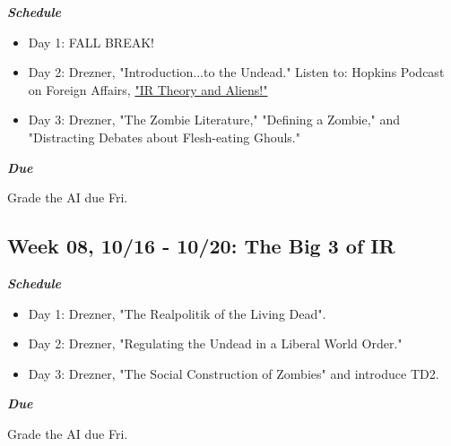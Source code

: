 \documentclass[11pt,]{article}
\begin{document}
\begin{multicols}{2}

\textbf{\textit{Schedule}}

\begin{itemize}

\item Day 1: FALL BREAK!

\item Day 2: Drezner, "Introduction...to the Undead." Listen to: Hopkins Podcast on Foreign Affairs, \href{https://hopkinspofa.com/2018/01/20/ir-theory-aliens/}{"IR Theory and Aliens!"}

\item Day 3: Drezner, "The Zombie Literature," "Defining a Zombie," and "Distracting Debates about Flesh-eating Ghouls."

\end{itemize}

\columnbreak

\begin{flushright}

\textbf{\textit{Due}}

Grade the AI due Fri.

\end{flushright}

\end{multicols}

\hypertarget{week-08-1016---1020-the-big-3-of-ir}{%
\subsection{Week 08, 10/16 - 10/20: The Big 3 of
IR}\label{week-08-1016---1020-the-big-3-of-ir}}

\begin{multicols}{2}

\textbf{\textit{Schedule}}

\begin{itemize}

\item Day 1: Drezner, "The Realpolitik of the Living Dead".

\item Day 2: Drezner, "Regulating the Undead in a Liberal World Order."

\item Day 3: Drezner, "The Social Construction of Zombies" and introduce TD2.

\end{itemize}

\columnbreak

\begin{flushright}

\textbf{\textit{Due}}

Grade the AI due Fri.

\end{flushright}

\end{multicols}
\end{document}
